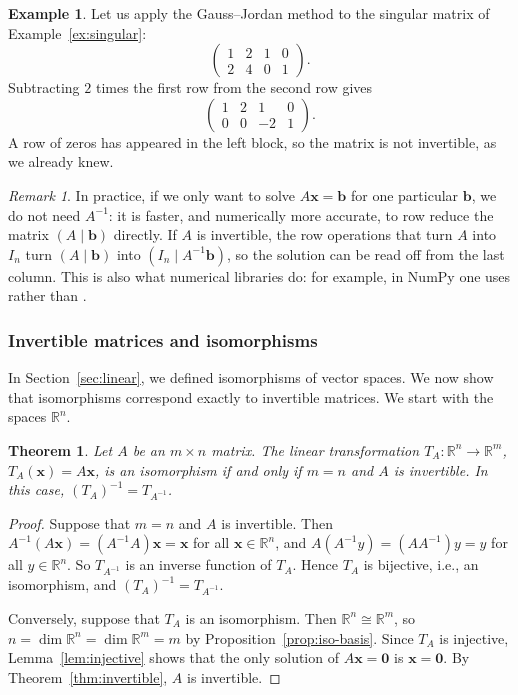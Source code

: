 \documentclass[11pt]{article}
\newcommand{\py}[1]{\texttt{\detokenize{#1}}}
\theoremstyle{definition}
\newtheorem{example}[definition]{Example}
\theoremstyle{plain}
\newtheorem{theorem}[definition]{Theorem}
\theoremstyle{remark}
\newtheorem{remark}[definition]{Remark}
\begin{document}
\begin{example}
    Let us apply the Gauss--Jordan method to the singular matrix of Example~\ref{ex:singular}:
    \[\left(\begin{array}{cc|cc}
        1 & 2 & 1 & 0 \\
        2 & 4 & 0 & 1
    \end{array}\right).\]
    Subtracting $2$ times the first row from the second row gives
    \[\left(\begin{array}{cc|cc}
        1 & 2 & 1 & 0 \\
        0 & 0 & -2 & 1
    \end{array}\right).\]
    A row of zeros has appeared in the left block, so the matrix is not invertible, as we already knew.
\end{example}

\begin{remark}\label{rem:solve-practice}
    In practice, if we only want to solve $A\mathbf{x} = \mathbf{b}$ for one particular $\mathbf{b}$, we do not need $A^{-1}$: it is faster, and numerically more accurate, to row reduce the matrix $(A \mid \mathbf{b})$ directly. If $A$ is invertible, the row operations that turn $A$ into $I_n$ turn $(A \mid \mathbf{b})$ into $(I_n \mid A^{-1}\mathbf{b})$, so the solution can be read off from the last column. This is also what numerical libraries do: for example, in NumPy one uses \py{np.linalg.solve(A, b)} rather than \py{np.linalg.inv(A) @ b}.
\end{remark}

\subsubsection{Invertible matrices and isomorphisms}

In Section~\ref{sec:linear}, we defined isomorphisms of vector spaces. We now show that isomorphisms correspond exactly to invertible matrices. We start with the spaces $\mathbb{R}^n$.

\begin{theorem}\label{thm:TA-iso}
    Let $A$ be an $m \times n$ matrix. The linear transformation $T_A: \mathbb{R}^n \to \mathbb{R}^m$, $T_A(\mathbf{x}) = A\mathbf{x}$, is an isomorphism if and only if $m = n$ and $A$ is invertible. In this case, $(T_A)^{-1} = T_{A^{-1}}$.
\end{theorem}

\begin{proof}
    Suppose that $m = n$ and $A$ is invertible. Then $A^{-1}(A\mathbf{x}) = (A^{-1}A)\mathbf{x} = \mathbf{x}$ for all $\mathbf{x} \in \mathbb{R}^n$, and $A(A^{-1}y) = (AA^{-1})y = y$ for all $y \in \mathbb{R}^n$. So $T_{A^{-1}}$ is an inverse function of $T_A$. Hence $T_A$ is bijective, i.e., an isomorphism, and $(T_A)^{-1} = T_{A^{-1}}$.

    Conversely, suppose that $T_A$ is an isomorphism. Then $\mathbb{R}^n \cong \mathbb{R}^m$, so $n = \dim \mathbb{R}^n = \dim \mathbb{R}^m = m$ by Proposition~\ref{prop:iso-basis}. Since $T_A$ is injective, Lemma~\ref{lem:injective} shows that the only solution of $A\mathbf{x} = \mathbf{0}$ is $\mathbf{x} = \mathbf{0}$. By Theorem~\ref{thm:invertible}, $A$ is invertible.
\end{proof}
\end{document}
